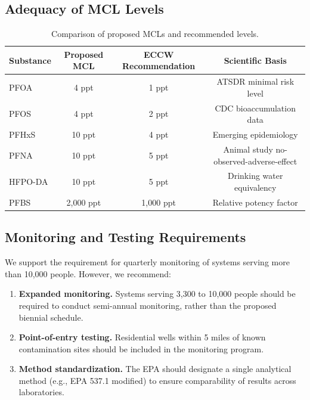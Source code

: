 \documentclass[
    language=english,
    doctype=public-comment,
    institution=none,
]{../../omnilatex}
\begin{document}
\subsection{Adequacy of MCL Levels}

\begin{table}[h]
    \centering
    \begin{tabular}{lccc}
        \toprule
        \textbf{Substance} & \textbf{Proposed MCL} & \textbf{ECCW Recommendation} & \textbf{Scientific Basis} \\
        \midrule
        PFOA & 4 ppt & 1 ppt & ATSDR minimal risk level \\
        PFOS & 4 ppt & 2 ppt & CDC bioaccumulation data \\
        PFHxS & 10 ppt & 4 ppt & Emerging epidemiology \\
        PFNA & 10 ppt & 5 ppt & Animal study no-observed-adverse-effect \\
        HFPO-DA & 10 ppt & 5 ppt & Drinking water equivalency \\
        PFBS & 2,000 ppt & 1,000 ppt & Relative potency factor \\
        \bottomrule
    \end{tabular}
    \caption{Comparison of proposed MCLs and recommended levels.}
\end{table}

\subsection{Monitoring and Testing Requirements}

We support the requirement for quarterly monitoring of systems serving more
than 10,000 people. However, we recommend:

\begin{enumerate}
    \item \textbf{Expanded monitoring.} Systems serving 3,300 to 10,000
          people should be required to conduct semi-annual monitoring,
          rather than the proposed biennial schedule.
    \item \textbf{Point-of-entry testing.} Residential wells within 5
          miles of known contamination sites should be included in the
          monitoring program.
    \item \textbf{Method standardization.} The EPA should designate a single
          analytical method (e.g., EPA 537.1 modified) to ensure
          comparability of results across laboratories.
\end{enumerate}
\end{document}
